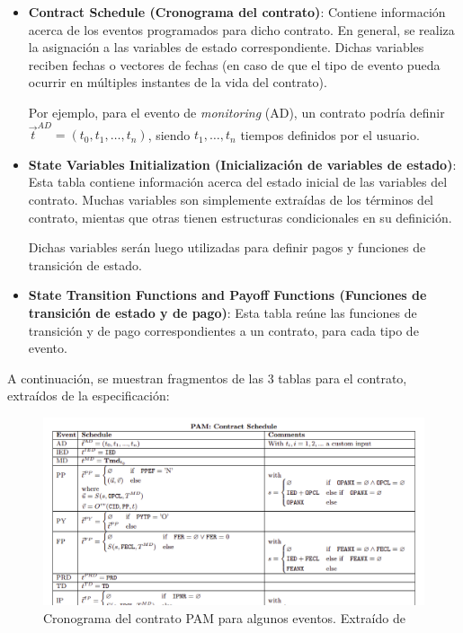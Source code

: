 \documentclass[12pt]{book}
\begin{document}
\begin{itemize}
    \item \textbf{Contract Schedule (Cronograma del contrato)}: Contiene información acerca de los eventos programados para dicho contrato. En general, se realiza la asignación a las variables de estado correspondiente. Dichas variables reciben fechas o vectores de fechas (en caso de que el tipo de evento pueda ocurrir en múltiples instantes de la vida del contrato).

          Por ejemplo, para el evento de \textit{monitoring} (AD), un contrato podría definir $\vec{t}^{AD} = \left(t_0,t_1, \ldots ,t_n\right)$, siendo $t_1, \ldots, t_n$ tiempos definidos por el usuario.

    \item \textbf{State Variables Initialization (Inicialización de variables de estado)}: Esta tabla contiene información acerca del estado inicial de las variables del contrato. Muchas variables son simplemente extraídas de los términos del contrato, mientas que otras tienen estructuras condicionales en su definición.

          Dichas variables serán luego utilizadas para definir pagos y funciones de transición de estado.

    \item \textbf{State Transition Functions and Payoff Functions (Funciones de transición de estado y de pago)}:
          Esta tabla reúne las funciones de transición y de pago correspondientes a un contrato, para cada tipo de evento.


\end{itemize}


A continuación, se muestran fragmentos de las 3 tablas para el contrato, extraídos de la especificación:

\begin{figure}
    \centering
    \includegraphics[width=\textwidth]{PAM_Contract_Schedule.png}
    \caption{Cronograma del contrato PAM para algunos eventos. Extraído de~\cite{ACTUS_Techspecs}}\label{fig:PAM_Contract_Schedule}
\end{figure}
\end{document}

